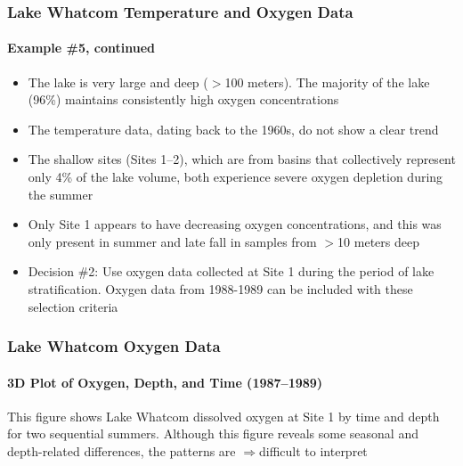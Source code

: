\documentclass[10pt]{beamer}
\newcommand{\bi}{\begin{itemize}}
\newcommand{\ei}{\end{itemize}}
\newcommand{\iwsframe}[2]{
\begin{frame}[fragile]
\frametitle{#1}
\framesubtitle{#2}
}
\begin{document}
\begin{frame}
\frametitle{Lake Whatcom Temperature and Oxygen Data}
\framesubtitle{Example \#5, continued}

{\footnotesize
  \bi
\item The lake is very large and deep ($>$100 meters).  The majority
  of the lake (96\%) maintains consistently high oxygen concentrations

\vspace{1ex}
\item The temperature data, dating back to the 1960s, do not show a
  clear trend
  
\vspace{1ex}
\item The shallow sites (Sites 1--2), which are from basins that collectively represent
  only 4\% of the lake volume, both experience severe oxygen depletion during the summer
  
\vspace{1ex}
\item Only Site 1 appears to have decreasing oxygen concentrations,
  and this was only present in summer and late fall in samples from $>$10 meters deep
  
\vspace{1ex}
\item {\color{red} Decision \#2:} Use oxygen data collected at Site 1
  during the period of lake stratification. Oxygen data from 1988-1989
  can be included with these selection criteria
  \ei
}
\end{frame}


\iwsframe{Lake Whatcom Oxygen Data}{3D Plot of Oxygen, Depth, and Time (1987--1989)}
\begin{center}
\end{center}

{\scriptsize This figure shows Lake Whatcom dissolved oxygen at Site 1 by
  time and depth for two sequential summers.  Although this figure
  reveals some seasonal and depth-related differences, the patterns are
  {\color{red} $\Rightarrow$}difficult to interpret\\}
\end{frame}
\end{document}
